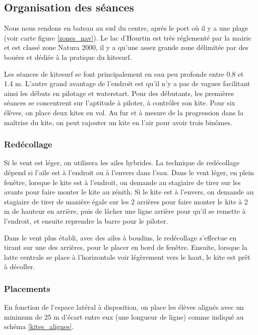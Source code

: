 \documentclass[11pt,a4paper]{report}
\begin{document}
\subsection{Organisation des séances}

Nous nous rendons en bateau au sud du centre, après le port o\`u
il y a une plage (voir carte figure \ref{zones_nav}). Le lac 
d'Hourtin est très réglementé par la mairie et est classé
zone Natura 2000\cite{natura2000}, 
il y a qu'une assez grande zone délimitée par des bouées et 
dédiée à la pratique du kitesurf.

Les séances de kitesurf se font principalement en eau peu profonde
entre 0.8 et 1.4 m. L'autre grand avantage de l'endroit est
qu'il n'y a pas de vagues facilitant ainsi les débuts en pilotage
et waterstart.
Pour des débutants, les premières séances se concentrent sur l'aptitude
à piloter, à contrôler son kite. Pour six élèves, on place deux kites en vol.
Au fur et à mesure de la progression dans la ma\^itrise du kite, 
on peut rajouter un kite en l'air pour avoir trois bin\^omes.

\subsubsection{Redécollage}

Si le vent est léger, on utilisera les ailes hybrides. La technique
de redécollage dépend si l'aile est à l'endroit ou à l'envers dans l'eau.
Dans le vent léger, en plein fen\^etre, lorsque
le kite est à l'endroit, on demande au stagiaire de tirer  sur les avants
pour faire monter le kite au zénith. 
Si le kite est à l'envers, on demande au stagiaire de tirer de manière
égale sur les 2 arrières pour faire monter le kite à 2 m de hauteur en arrière, 
puis de lâcher une ligne arrière pour qu'il se remette à l'endroit,
et ensuite reprendre la barre pour le piloter.

Dans le vent plus établi, avec des ailes à boudins, le redécollage s'effectue
en tirant sur une des arrières, pour le placer en bord de fenêtre.
Ensuite, lorsque la latte centrale se place à l'horizontale voir légèrement vers
le haut, le kite est pr\^et à décoller.

\subsubsection{Placements}

En fonction de l'espace latéral à disposition, on place les élèves
alignés avec un minimum de 25 m d'écart entre eux (une longueur de ligne) 
comme indiqué au schéma \ref{kites_alignes}.
\end{document}
